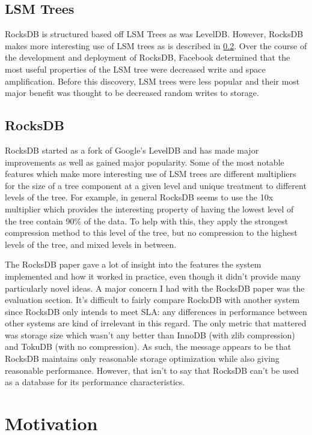 \documentclass[twocolumn,11pt]{article}
\begin{document}
\subsection{LSM Trees}

RocksDB is structured based off LSM Trees as was LevelDB\cite{leveldb}. However,
RocksDB makes more interesting use of LSM trees as is described in
\ref{subsec:rocksdb}. Over the course of the development and deployment of
RocksDB, Facebook determined that the most useful properties of the LSM tree
were decreased write and space amplification. Before this discovery, LSM trees
were less popular and their most major benefit was thought to be decreased
random writes to storage.

\subsection{RocksDB}
\label{subsec:rocksdb}

RocksDB\cite{rocksdb} started as a fork of Google's LevelDB\cite{leveldb} and
has made major improvements as well as gained major popularity. Some of the most
notable features which make more interesting use of LSM trees are different
multipliers for the size of a tree component at a given level and unique
treatment to different levels of the tree. For example, in general RocksDB seems
to use the 10x multiplier which provides the interesting property of having the
lowest level of the tree contain 90\% of the data. To help with this, they apply
the strongest compression method to this level of the tree, but no compression
to the highest levels of the tree, and mixed levels in between.

The RocksDB paper gave a lot of insight into the features the system implemented
and how it worked in practice, even though it didn't provide many particularly
novel ideas. A major concern I had with the RocksDB paper was the evaluation
section. It's difficult to fairly compare RocksDB with another system since
RocksDB only intends to meet SLA: any differences in performance between other
systems are kind of irrelevant in this regard. The only metric that mattered was
storage size which wasn't any better than InnoDB (with zlib compression) and
TokuDB (with no compression). As such, the message appears to be that RocksDB
maintains only reasonable storage optimization while also giving reasonable
performance. However, that isn't to say that RocksDB can't be used as a database
for its performance characteristics.

\section{Motivation}
\end{document}
